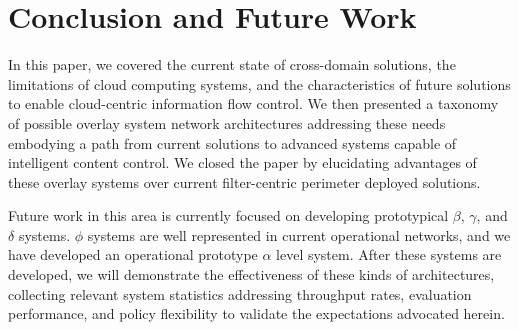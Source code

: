 \documentclass{sig-alternate}
\begin{document}






\section{Conclusion and Future Work}
In this paper, we covered the current state of cross-domain solutions, the limitations of cloud computing systems, and the characteristics of future solutions to enable cloud-centric information flow control.  We then presented a taxonomy of possible overlay system network architectures addressing these needs embodying a path from current solutions to advanced systems capable of intelligent content control.  We closed the paper by elucidating advantages of these overlay systems over current filter-centric perimeter deployed solutions.

Future work in this area is currently focused on developing prototypical $\beta$, $\gamma$, and $\delta$ systems.  $\phi$ systems are well represented in current operational networks, and we have developed an operational prototype $\alpha$ level system.  After these systems are developed, we will demonstrate the effectiveness of these kinds of architectures, collecting relevant system statistics addressing throughput rates, evaluation performance, and policy flexibility to validate the expectations advocated herein.



\end{document}
